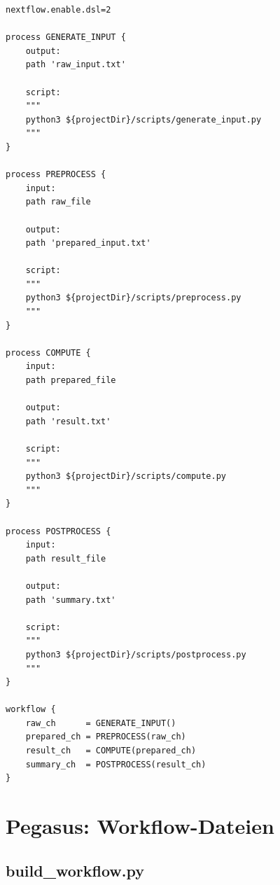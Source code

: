 \begin{lstlisting}[caption={main.nf: Vollständige Workflow-Datei (Nextflow DSL2)},
                   label={lst:app:nextflow:mainnf}]
nextflow.enable.dsl=2

process GENERATE_INPUT {
    output:
    path 'raw_input.txt'

    script:
    """
    python3 ${projectDir}/scripts/generate_input.py
    """
}

process PREPROCESS {
    input:
    path raw_file

    output:
    path 'prepared_input.txt'

    script:
    """
    python3 ${projectDir}/scripts/preprocess.py
    """
}

process COMPUTE {
    input:
    path prepared_file

    output:
    path 'result.txt'

    script:
    """
    python3 ${projectDir}/scripts/compute.py
    """
}

process POSTPROCESS {
    input:
    path result_file

    output:
    path 'summary.txt'

    script:
    """
    python3 ${projectDir}/scripts/postprocess.py
    """
}

workflow {
    raw_ch      = GENERATE_INPUT()
    prepared_ch = PREPROCESS(raw_ch)
    result_ch   = COMPUTE(prepared_ch)
    summary_ch  = POSTPROCESS(result_ch)
}
\end{lstlisting}

\chapter{Pegasus: Workflow-Dateien}
\label{app:pegasus}

\section{build\_workflow.py}
\label{app:pegasus:buildwf}

